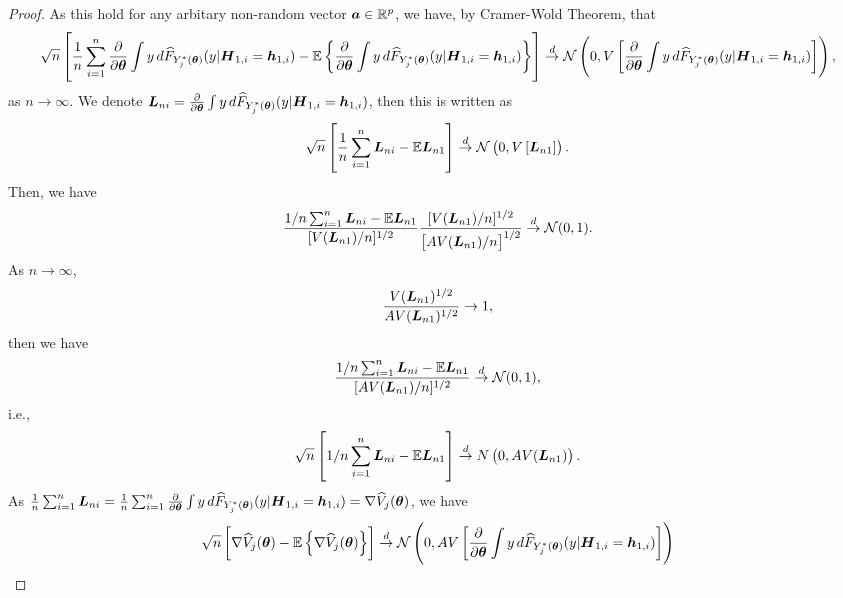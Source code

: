 \begin{proof}
	As this hold for any arbitary non-random vector $\boldsymbol{a}\in \mathbb{R}^p$, we have, by Cramer-Wold Theorem, that
	\begin{gather*}
	\sqrt{n}\lt[\mean[n] \pard[\bs{\theta}]\int y \,d  \wh{F}_{Y_j^*(\bs{\theta})}(y | \bs{H}_{1,i} = \bs{h}_{1,i}) -\mathbb{E}\lt\{ \pard[\bs{\theta}]\int y \,d  \wh{F}_{Y_j^*(\bs{\theta})}(y | \bs{H}_{1,i} = \bs{h}_{1,i})\rt\}\rt]\overset{d}{\to}\mathcal{N}\lt(0,V\lt[\pard[\bs{\theta}]\int y \,d  \wh{F}_{Y_j^*(\bs{\theta})}(y | \bs{H}_{1,i} = \bs{h}_{1,i})\rt]\rt),
	\end{gather*}
	as $n \to \infty$. We denote $\bs{L}_{ni}= \pard[\bs{\theta}]\int y \,d  \wh{F}_{Y_j^*(\bs{\theta})}(y | \bs{H}_{1,i} = \bs{h}_{1,i})$,
	then this is written as
	\begin{gather*}
	\sqrt{n}\left[\frac{1}{n}\sum_{i=1}^{n}\boldsymbol{L}_{ni}-\mathbb{E}\boldsymbol{L}_{n1}\right]\overset{d}{\to}\mathcal{N}\left(0,V\left[\boldsymbol{L}_{n1}\right]\right).
	\end{gather*}
	Then, we have
	\begin{gather*}
	\frac{1/n\sum_{i=1}^{n}\boldsymbol{L}_{ni}-\mathbb{E}\boldsymbol{L}_{n1}}{[V(\boldsymbol{L}_{n1})/n]^{1/2}}\frac{[V(\boldsymbol{L}_{n1})/n]^{1/2}}{\left[AV(\boldsymbol{L}_{n1})/n\right]^{1/2}}\overset{d}{\to}\mathcal{N}(0,1).
	\end{gather*}
	As  $n \to \infty$,
	\begin{gather*}
	\frac{V(\boldsymbol{L}_{n1})^{1/2}}{AV(\boldsymbol{L}_{n1})^{1/2}}\to1,
	\end{gather*}
	then we have
	\begin{gather*}
	\frac{1/n\sum_{i=1}^{n}\boldsymbol{L}_{ni}-\mathbb{E}\boldsymbol{L}_{n1}}{[AV(\boldsymbol{L}_{n1})/n]^{1/2}}\overset{d}{\to}\mathcal{N}(0,1),
	\end{gather*}
	i.e.,
	\begin{gather*}
	\sqrt{n}\left[1/n\sum_{i=1}^{n}\boldsymbol{L}_{ni}-\mathbb{E}\boldsymbol{L}_{n1}\right]\overset{d}{\to}N\left(0,AV(\boldsymbol{L}_{n1})\right).
	\end{gather*}
	As $\frac{1}{n}\sum_{i=1}^{n}\bs{L}_{ni} =\mean[n] \pard[\bs{\theta}]\int y \,d  \wh{F}_{Y_j^*(\bs{\theta})}(y | \bs{H}_{1,i} = \bs{h}_{1,i}) = \nabla \wh{V}_j(\bs{\theta})$, we have
	\begin{gather}
	\begin{flalign*}
	\sqrt{n}\lt[\nabla \wh{V}_j(\bs{\theta})  -\mathbb{E}\lt\{\nabla \wh{V}_j(\bs{\theta})\rt\}\rt]\overset{d}{\to}\mathcal{N}\lt(0,AV\lt[\pard[\bs{\theta}] \int y \,d  \wh{F}_{Y_j^*(\bs{\theta})}(y | \bs{H}_{1,i} = \bs{h}_{1,i}) \rt]\rt)
	\end{flalign*}
	\end{gather}
\end{proof}
